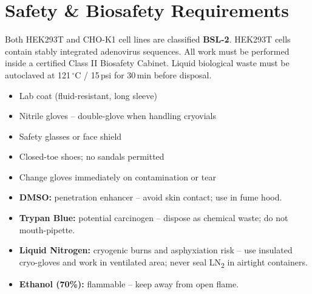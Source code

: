 
\section{Safety \& Biosafety Requirements}

\begin{minipage}[t]{0.475\linewidth}
  \begin{tcolorbox}[cautionbox, title=\faExclamationTriangle\enspace Biosafety Level]
    Both HEK293T and CHO-K1 cell lines are classified \textbf{BSL-2}. HEK293T cells
    contain stably integrated adenovirus sequences. All work must be performed inside
    a certified Class II Biosafety Cabinet. Liquid biological waste must be
    autoclaved at 121\,$^\circ$C / 15\,psi for 30\,min before disposal.
  \end{tcolorbox}
\end{minipage}
\hfill
\begin{minipage}[t]{0.475\linewidth}
  \begin{tcolorbox}[timingbox, title=\faLock\enspace Personal Protective Equipment]
    \begin{itemize}
      \item Lab coat (fluid-resistant, long sleeve)
      \item Nitrile gloves -- double-glove when handling cryovials
      \item Safety glasses or face shield
      \item Closed-toe shoes; no sandals permitted
      \item Change gloves immediately on contamination or tear
    \end{itemize}
  \end{tcolorbox}
\end{minipage}

\vspace{6pt}

\begin{tcolorbox}[infobox, title=\faInfoCircle\enspace Chemical Hazards]
  \begin{itemize}
    \item \textbf{DMSO:} penetration enhancer -- avoid skin contact; use in fume hood.
    \item \textbf{Trypan Blue:} potential carcinogen -- dispose as chemical waste; do not mouth-pipette.
    \item \textbf{Liquid Nitrogen:} cryogenic burns and asphyxiation risk -- use insulated cryo-gloves and
          work in ventilated area; never seal LN\textsubscript{2} in airtight containers.
    \item \textbf{Ethanol (70\%):} flammable -- keep away from open flame.
  \end{itemize}
\end{tcolorbox}
